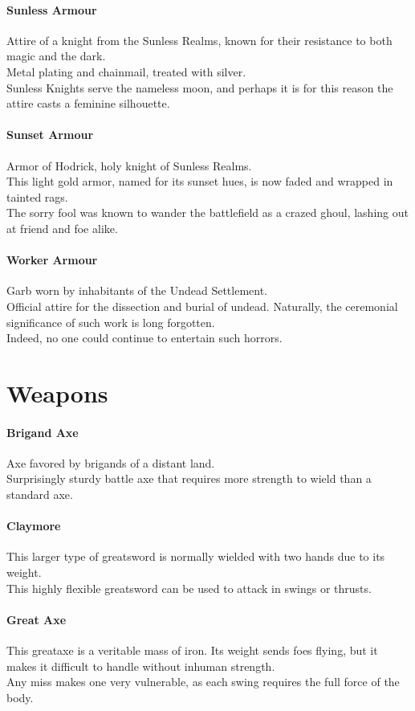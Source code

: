 \documentclass[twocolumn,a4paper]{article}
\begin{document}
\paragraph{Sunless Armour}
Attire of a knight from the Sunless Realms, known for their resistance to both magic and the dark.\\
Metal plating and chainmail, treated with silver.\\
Sunless Knights serve the nameless moon, and perhaps it is for this reason the attire casts a feminine silhouette.
\paragraph{Sunset Armour}
Armor of Hodrick, holy knight of Sunless Realms.\\
This light gold armor, named for its sunset hues, is now faded and wrapped in tainted rags.\\
The sorry fool was known to wander the battlefield as a crazed ghoul, lashing out at friend and foe alike.
\paragraph{Worker Armour}
Garb worn by inhabitants of the Undead Settlement.\\
Official attire for the dissection and burial of undead. Naturally, the ceremonial significance of such work is long forgotten.\\
Indeed, no one could continue to entertain such horrors.
\section*{Weapons}
\paragraph{Brigand Axe}
Axe favored by brigands of a distant land.\\
Surprisingly sturdy battle axe that requires more strength to wield than a standard axe.
\paragraph{Claymore}
This larger type of greatsword is normally wielded with two hands due to its weight.\\
This highly flexible greatsword can be used to attack in swings or thrusts.
\paragraph{Great Axe}
This greataxe is a veritable mass of iron. Its weight sends foes flying, but it makes it difficult to handle without inhuman strength.\\
Any miss makes one very vulnerable, as each swing requires the full force of the body.
\end{document}
